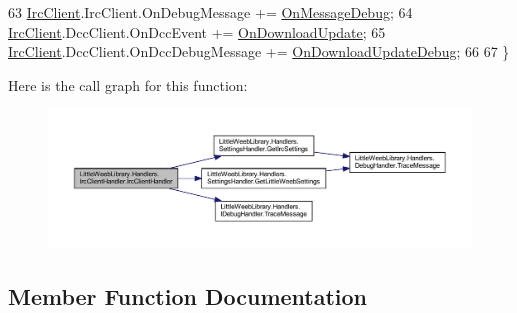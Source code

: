 \begin{DoxyCode}
63             \mbox{\hyperlink{class_little_weeb_library_1_1_handlers_1_1_irc_client_handler_a1c78638ea8025b27bb3e604f432ce325}{IrcClient}}.IrcClient.OnDebugMessage += \mbox{\hyperlink{class_little_weeb_library_1_1_handlers_1_1_irc_client_handler_a2b48c617972be0b3079a262ffc8141f6}{OnMessageDebug}};
64             \mbox{\hyperlink{class_little_weeb_library_1_1_handlers_1_1_irc_client_handler_a1c78638ea8025b27bb3e604f432ce325}{IrcClient}}.DccClient.OnDccEvent += \mbox{\hyperlink{class_little_weeb_library_1_1_handlers_1_1_irc_client_handler_afef5cc2f76989366cb52ffa7d5a78752}{OnDownloadUpdate}};
65             \mbox{\hyperlink{class_little_weeb_library_1_1_handlers_1_1_irc_client_handler_a1c78638ea8025b27bb3e604f432ce325}{IrcClient}}.DccClient.OnDccDebugMessage += 
      \mbox{\hyperlink{class_little_weeb_library_1_1_handlers_1_1_irc_client_handler_abdc8785a2452e7a1d496c44a424d1812}{OnDownloadUpdateDebug}};            
66 
67         \}
\end{DoxyCode}
Here is the call graph for this function\+:\nopagebreak
\begin{figure}[H]
\begin{center}
\leavevmode
\includegraphics[width=350pt]{class_little_weeb_library_1_1_handlers_1_1_irc_client_handler_a01745667c95f2c3d5c461f708aa13bb8_cgraph}
\end{center}
\end{figure}


\subsection{Member Function Documentation}
\mbox{\label{class_little_weeb_library_1_1_handlers_1_1_irc_client_handler_a510c909225e51c66b65f7114ebd356d3}} 
